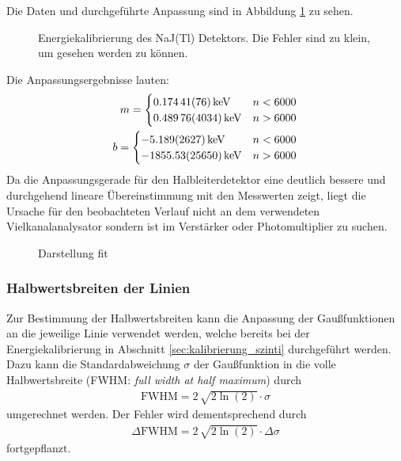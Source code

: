 \documentclass[11pt, a4paper]{article}
\numberwithin{equation}{section}
\begin{document}
Die Daten und durchgeführte Anpassung sind in Abbildung \ref{fig:kalibrierung_szinti} zu sehen.
\begin{figure}[ht]
	\centering
	
	\caption{Energiekalibrierung des NaJ(Tl) Detektors. Die Fehler sind zu klein, um gesehen werden zu können.}
	\label{fig:kalibrierung_szinti}
\end{figure}
Die Anpassungsergebnisse lauten:
\begin{align}
	m = 
	\begin{cases}
	\SI{0.17441+-0.00076}{\kilo\electronvolt} & n < 6000 \\
	\SI{0.48976+-0.04034}{\kilo\electronvolt} & n > 6000
	\end{cases}\\
	b = 
	\begin{cases}
	\SI{-5.189+-2.627}{\kilo\electronvolt} & n < 6000 \\
	\SI{-1855.53+-256.50}{\kilo\electronvolt} & n > 6000
	\end{cases}
\end{align}
Da die Anpassungsgerade für den Halbleiterdetektor eine deutlich bessere und durchgehend lineare Übereinstimmung mit den Messwerten zeigt, liegt die Ursache für den beobachteten Verlauf nicht an dem verwendeten Vielkanalanalysator sondern ist im Verstärker oder Photomultiplier zu suchen.

\begin{figure}[h]
	\centering
	
	\caption{Darstellung fit}
	\label{fig:fit_darstellung_szinti}
\end{figure}

\subsubsection{Halbwertsbreiten der Linien}
Zur Bestimmung der Halbwertsbreiten kann die Anpassung der Gaußfunktionen an die jeweilige Linie verwendet werden, welche bereits bei der Energiekalibrierung in Abschnitt \ref{sec:kalibrierung_szinti} durchgeführt werden.
Dazu kann die Standardabweichung $\sigma$ der Gaußfunktion in die volle Halbwertsbreite (FWHM: \textit{full width at half maximum}) durch
\begin{align}
	\text{FWHM} = 2 \, \sqrt{2\ln(2)} \cdot \sigma
\end{align}
umgerechnet werden.
Der Fehler wird dementsprechend durch
\begin{align}
	\Delta \text{FWHM} = 2 \, \sqrt{2\ln(2)} \cdot \Delta \sigma
\end{align}
fortgepflanzt.
\end{document}
